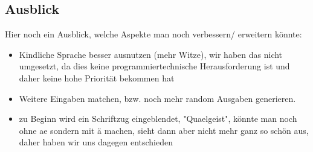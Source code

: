 \documentclass[10pt,a4paper]{article}
\begin{document}
\subsection*{Ausblick}
Hier noch ein Ausblick, welche Aspekte man noch verbessern/ erweitern könnte:
\begin{itemize}
\item Kindliche Sprache besser ausnutzen (mehr Witze), wir haben das nicht umgesetzt, da dies keine programmiertechnische Herausforderung ist und daher keine hohe Priorität bekommen hat
\item Weitere Eingaben matchen, bzw. noch mehr random Ausgaben generieren.
\item zu Beginn wird ein Schriftzug eingeblendet, "Quaelgeist", könnte man noch ohne ae sondern mit ä machen, sieht dann aber nicht mehr ganz so schön aus, daher haben wir uns dagegen entschieden
\end{itemize}
\end{document}
